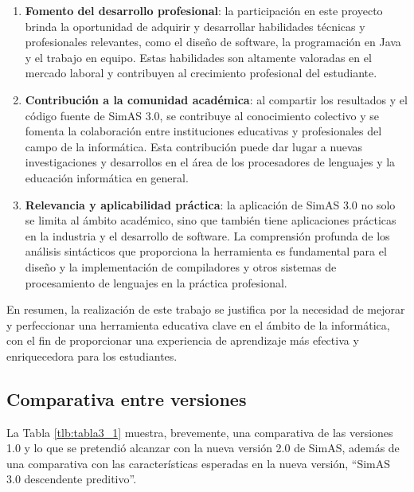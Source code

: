 \begin{enumerate}
    \item \textbf{Fomento del desarrollo profesional}: la participación en este proyecto brinda la oportunidad de adquirir y desarrollar habilidades técnicas y profesionales relevantes, como el diseño de software, la programación en Java y el trabajo en equipo. Estas habilidades son altamente valoradas en el mercado laboral y contribuyen al crecimiento profesional del estudiante.
    
    \item \textbf{Contribución a la comunidad académica}: al compartir los resultados y el código fuente de SimAS 3.0, se contribuye al conocimiento colectivo y se fomenta la colaboración entre instituciones educativas y profesionales del campo de la informática. Esta contribución puede dar lugar a nuevas investigaciones y desarrollos en el área de los procesadores de lenguajes y la educación informática en general.
    
    \item \textbf{Relevancia y aplicabilidad práctica}: la aplicación de SimAS 3.0 no solo se limita al ámbito académico, sino que también tiene aplicaciones prácticas en la industria y el desarrollo de software. La comprensión profunda de los análisis sintácticos que proporciona la herramienta es fundamental para el diseño y la implementación de compiladores y otros sistemas de procesamiento de lenguajes en la práctica profesional.

\end{enumerate}

En resumen, la realización de este trabajo se justifica por la necesidad de mejorar y perfeccionar una herramienta educativa clave en el ámbito de la informática, con el fin de proporcionar una experiencia de aprendizaje más efectiva y enriquecedora para los estudiantes.


\subsection{Comparativa entre versiones}
La Tabla \ref{tlb:tabla3_1} muestra, brevemente, una comparativa de las versiones 1.0 y lo que se pretendió alcanzar con la nueva versión 2.0 de SimAS, además de una comparativa con las características esperadas en la nueva versión, ``SimAS 3.0 descendente preditivo''. 

